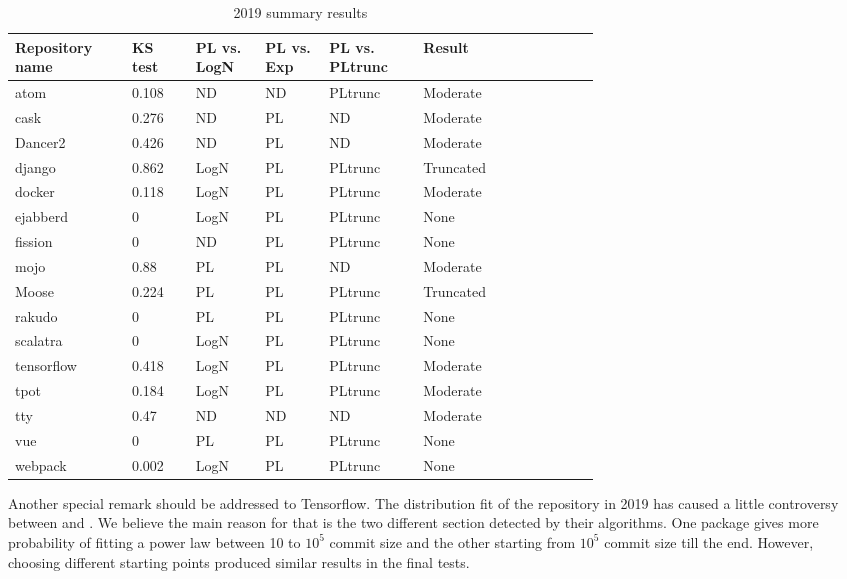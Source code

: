 \documentclass{article}
\begin{document}
\begin{table}[h!tbp]
  \caption{2019 summary results}
  \begin{center}
    \begin{tabular}{| p{0.12\linewidth} | p{0.08\linewidth} |
        p{0.08\linewidth} | p{0.08\linewidth} | p{0.1\linewidth}
        |p{0.13\linewidth} | p{0.09\linewidth} |}
      \hline
      Repository name & KS test & PL vs. LogN & PL vs. Exp & PL vs. PLtrunc & Result \\ 
      \hline
      atom &0.108 &ND &ND &PLtrunc & Moderate\\
      cask &0.276 &ND &PL &ND & Moderate \\
      Dancer2 &0.426 &ND &PL &ND & Moderate \\
      django &0.862 &LogN &PL &PLtrunc &Truncated \\
      docker &0.118 &LogN &PL &PLtrunc & Moderate \\
      ejabberd &0 &LogN &PL &PLtrunc & None\\
      fission &0 &ND &PL &PLtrunc & None \\
      mojo &0.88 &PL &PL &ND &Moderate \\
      Moose &0.224 &PL &PL &PLtrunc &Truncated \\
      rakudo &0 &PL &PL &PLtrunc & None \\
      scalatra &0 &LogN &PL &PLtrunc & None \\
      tensorflow &0.418 &LogN &PL &PLtrunc & Moderate \\
      tpot &0.184 &LogN &PL &PLtrunc & Moderate \\
      tty &0.47 &ND &ND &ND & Moderate \\
      vue &0 &PL &PL &PLtrunc & None \\
      webpack &0.002 &LogN &PL &PLtrunc & None\\
      \hline
    \end{tabular}
  \end{center}
  \label{tab:2019tests}
\end{table}
%
Another special remark should be addressed to Tensorflow. The
distribution fit of the repository in 2019 has caused a little
controversy between \cite{alstott2014powerlaw} and
\cite{gillespie2015power}. We believe the main reason for that is the
two different section detected by their algorithms. One package gives
more probability of fitting a power law between 10 to $10^5$ commit
size and the other starting from $10^5$ commit size till the
end. However, choosing different starting points produced similar
results in the final
tests. %
\end{document}
